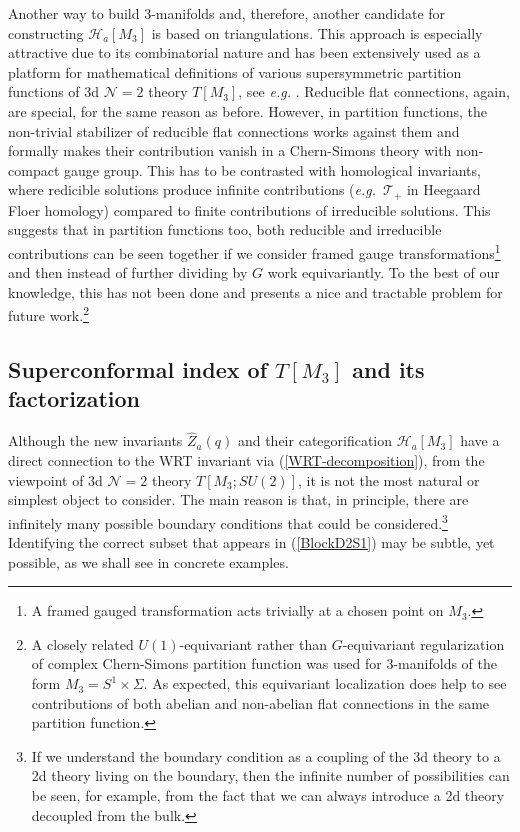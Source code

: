 \documentclass[hyper,letterpaper]{JHEP3}
\renewcommand{\hat}{\widehat}
\def\CH{{\mathcal H}}
\def\CN{{\mathcal N}}
\def\CT{{\mathcal T}}
\begin{document}
Another way to build 3-manifolds and, therefore, another candidate for constructing $\CH_a[M_3]$ is based on triangulations.
This approach is especially attractive due to its combinatorial nature and has been extensively used as a platform
for mathematical definitions of various supersymmetric partition functions of 3d $\CN=2$ theory $T[M_3]$,
see {\it e.g.} \cite{Andersen:2011bt,Andersen:2013rxa,Andersen:2015tma,Garoufalidis:2013rca,MR3522084,Garoufalidis:2013axa,Garoufalidis:2016ckn}.
Reducible flat connections, again, are special, for the same reason as before. However, in partition functions,
the non-trivial stabilizer of reducible flat connections works against them and formally makes their contribution
vanish in a Chern-Simons theory with non-compact gauge group. This has to be contrasted with homological invariants,
where redicible solutions produce infinite contributions ({\it e.g.}~$\CT_+$ in Heegaard Floer homology)
compared to finite contributions of irreducible solutions. This suggests that in partition functions too,
both reducible and irreducible contributions can be seen together if we consider framed gauge transformations\footnote{A framed gauged transformation acts
trivially at a chosen point on $M_3$.} and then instead of further dividing by $G$ work equivariantly.
To the best of our knowledge, this has not been done and presents a nice and tractable problem for future work.\footnote{A closely
related $U(1)$-equivariant rather than $G$-equivariant regularization of complex Chern-Simons partition function
was used \cite{equivariant} for 3-manifolds of the form $M_3 = S^1 \times \Sigma$.
As expected, this equivariant localization does help to
see contributions of both abelian and non-abelian flat connections in the same partition function.}


\subsection{Superconformal index of ${T[M_3]}$ and its factorization}

Although the new invariants $\hat{Z}_a(q)$ and their categorification $\CH_a[M_3]$ have a direct connection to the WRT invariant via (\ref{WRT-decomposition}), from the viewpoint of 3d $\CN=2$ theory $T[M_3;SU(2)]$, it is not the most natural or simplest object to consider. The main reason is that, in principle, there are infinitely many possible boundary conditions that could be considered.\footnote{If we understand the boundary condition as a coupling of the 3d theory to a 2d theory living on the boundary, then the infinite number of possibilities can be seen, for example, from the fact that we can always introduce a 2d theory decoupled from the bulk.} Identifying the correct subset that appears in (\ref{BlockD2S1}) may be subtle, yet possible, as we shall see in concrete examples.
\end{document}
